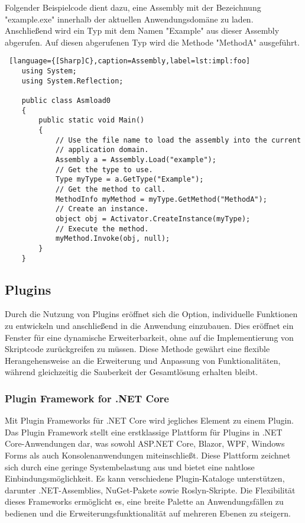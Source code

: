 Folgender Beispielcode dient dazu, eine Assembly mit der Bezeichnung "example.exe" innerhalb 
der aktuellen Anwendungsdomäne zu laden. Anschließend wird ein Typ mit dem Namen "Example" 
aus dieser Assembly abgerufen. Auf diesen abgerufenen Typ wird die Methode "MethodA" ausgeführt.\\

\begin{lstlisting} [language={[Sharp]C},caption=Assembly,label=lst:impl:foo]
    using System;
    using System.Reflection;
    
    public class Asmload0
    {
        public static void Main()
        {
            // Use the file name to load the assembly into the current
            // application domain.
            Assembly a = Assembly.Load("example");
            // Get the type to use.
            Type myType = a.GetType("Example");
            // Get the method to call.
            MethodInfo myMethod = myType.GetMethod("MethodA");
            // Create an instance.
            object obj = Activator.CreateInstance(myType);
            // Execute the method.
            myMethod.Invoke(obj, null);
        }
    }
\end{lstlisting}

\newpage
\subsection*{Plugins}

Durch die Nutzung von Plugins eröffnet sich die Option, individuelle Funktionen 
zu entwickeln und anschließend in die Anwendung einzubauen. 
Dies eröffnet ein Fenster für eine dynamische Erweiterbarkeit, ohne auf die Implementierung 
von Skriptcode zurückgreifen zu müssen. Diese Methode gewährt eine flexible 
Herangehensweise an die Erweiterung und Anpassung von Funktionalitäten, während 
gleichzeitig die Sauberkeit der Gesamtlösung erhalten bleibt.

\subsubsection*{Plugin Framework for .NET Core}

Mit Plugin Frameworks für .NET Core wird jegliches Element zu einem Plugin. Das Plugin 
Framework stellt eine erstklassige Plattform für Plugins in .NET Core-Anwendungen dar, was 
sowohl ASP.NET Core, Blazor, WPF, Windows Forms als auch Konsolenanwendungen miteinschließt. 
Diese Plattform zeichnet sich durch eine geringe Systembelastung aus und bietet eine nahtlose 
Einbindungsmöglichkeit. Es kann verschiedene Plugin-Kataloge unterstützen, 
darunter .NET-Assemblies, NuGet-Pakete sowie Roslyn-Skripte. 
Die Flexibilität dieses Frameworks ermöglicht es, eine breite Palette an Anwendungsfällen 
zu bedienen und die Erweiterungsfunktionalität auf mehreren Ebenen zu steigern.

